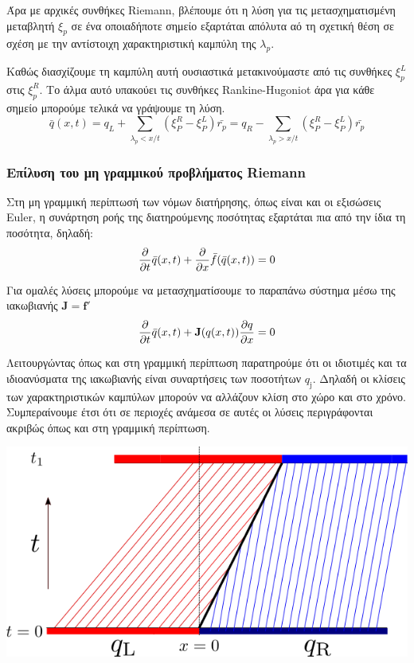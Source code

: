 Άρα με αρχικές συνθήκες Riemann, βλέπουμε ότι η λύση για τις μετασχηματισμένη μεταβλητή $\xi _p$ σε ένα οποιαδήποτε σημείο εξαρτάται απόλυτα αό τη σχετική θέση σε σχέση με την αντίστοιχη χαρακτηριστική καμπύλη της $\lambda _p$.  

Καθώς διασχίζουμε τη καμπύλη αυτή ουσιαστικά μετακινούμαστε από τις συνθήκες $\xi^L_p$ στις $\xi^R_p$. Το άλμα αυτό υπακούει τις συνθήκες Rankine-Hugoniot  άρα για κάθε σημείο μπορούμε τελικά να γράψουμε τη λύση.
\begin{equation}
\bar{q}(x,t)=q_L + \sum_{\lambda_p<x/t} (\xi ^R_P - \xi ^L_P) \bar{r_p}
			=q_R - \sum_{\lambda_p>x/t} (\xi ^R_P - \xi ^L_P) \bar{r_p}
\end{equation}

\subsubsection{Επίλυση του μη γραμμικού προβλήματος Riemann}
Στη μη γραμμική περίπτωσή των νόμων διατήρησης, όπως είναι και οι εξισώσεις Euler, η συνάρτηση ροής της διατηρούμενης ποσότητας εξαρτάται πια από την ίδια τη ποσότητα, δηλαδή:
\begin{equation}
\pdv{t} \bar{q}(x,t) + \pdv{x} \bar{f}(\bar{q}(x,t)) = 0 
\end{equation}

Για ομαλές λύσεις μπορούμε να μετασχηματίσουμε το παραπάνω σύστημα μέσω της ιακωβιανής $\mathbf{J} =\mathbf{f}'$
\begin{equation}
\pdv{t} \bar{q}(x,t) + \mathbf{J}(q(x,t)) \pdv{q}{x}  = 0 
\end{equation}

Λειτουργώντας όπως και στη γραμμική περίπτωση παρατηρούμε ότι οι ιδιοτιμές και τα ιδιοανύσματα της ιακωβιανής είναι συναρτήσεις των ποσοτήτων $q_\mathrm{j}$. Δηλαδή οι κλίσεις των χαρακτηριστικών καμπύλων μπορούν να αλλάζουν κλίση στο χώρο και στο χρόνο. Συμπεραίνουμε έτσι ότι σε περιοχές ανάμεσα σε αυτές οι λύσεις περιγράφονται ακριβώς όπως και στη γραμμική περίπτωση.
\begin{marginfigure}
	\centering
	\includegraphics[width=1\linewidth]{Images/shockwave}
	\caption{}
	\label{fig:shockwave}
\end{marginfigure}


